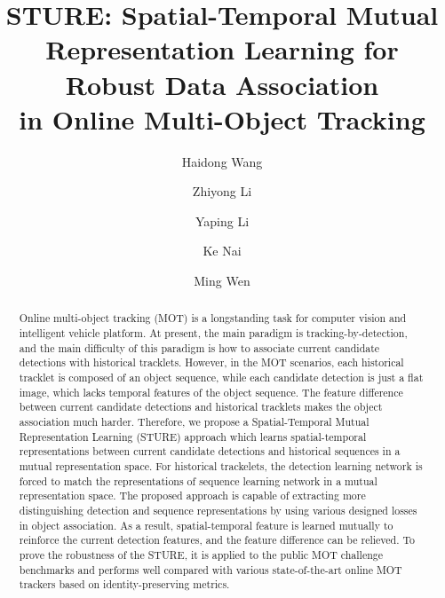\documentclass[times,twocolumn,final,authoryear]{elsarticle}
\begin{document}
\begin{frontmatter}

\title{STURE: Spatial-Temporal Mutual {Representation} Learning for Robust Data Association \\in Online Multi-Object Tracking}

\author[1]{Haidong {Wang}} 
\author[1]{Zhiyong {Li}}
\author[1]{Yaping {Li}}
\author[1]{Ke {Nai}}
\author[2]{Ming {Wen}}

\address[1]{College of Computer Science and Electronic Engineering of Hunan University, and Key Laboratory for Embedded and Network Computing of Hunan Province, Hunan Province, Changsha and 410082, China}
\address[2]{State Grid Hunan Electric Power Company Limited Economical Technical Research Institute, Hunan Key Laboratory of Energy Internet Supply-demand and Operation, Hunan Province, Changsha and 410000, China}



\begin{abstract}
Online multi-object tracking (MOT) is a longstanding task for computer vision and intelligent vehicle platform. 
At present, the main paradigm is tracking-by-detection, and the main difficulty of this paradigm is how to associate current candidate {detections} with historical tracklets. 
However, in the MOT scenarios, each historical tracklet is composed of an object sequence, while each candidate detection is just a flat image, which lacks temporal features of the object sequence. 
The feature difference between current candidate {detections} and historical tracklets makes the object association much harder. 
Therefore, we propose a Spatial-Temporal Mutual {Representation} Learning (STURE) approach which learns spatial-temporal representations between current candidate {detections} and historical {sequences} in a mutual representation space. 
For historical trackelets, the detection learning network is forced to match the representations of sequence learning network in a mutual representation space. 
The proposed approach is capable of extracting more distinguishing detection and sequence representations by using various designed losses in object association. 
As a result, spatial-temporal feature is learned mutually to reinforce the current detection features, and the feature difference can be relieved. 
To prove the robustness of the STURE, it is applied to the public MOT challenge benchmarks and performs well compared with various state-of-the-art online MOT trackers based on identity-preserving metrics.
\end{abstract}


\end{frontmatter}
\end{document}
